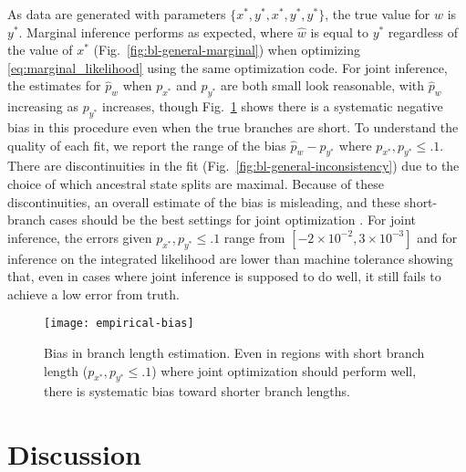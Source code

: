 \documentclass[11pt]{article}
\begin{document}
As data are generated with parameters $\{x^*, y^*, x^*, y^*, y^*\}$, the true value for $w$ is $y^*$.
Marginal inference performs as expected, where $\hat{w}$ is equal to $y^*$ regardless of the value of $x^*$ (Fig.~\ref{fig:bl-general-marginal}) when optimizing \eqref{eq:marginal_likelihood} using the same optimization code.
For joint inference, the estimates for $\hat{p}_w$ when $p_{x^*}$ and $p_{y^*}$ are both small look reasonable, with $\hat{p}_w$ increasing as $p_{y^*}$ increases, though Fig.~\ref{fig:empirical-bias} shows there is a systematic negative bias in this procedure even when the true branches are short.
To understand the quality of each fit, we report the range of the bias $\hat{p}_w-p_{y^*}$ where $p_{x^*}, p_{y^*} \le .1$.
There are discontinuities in the fit (Fig.~\ref{fig:bl-general-inconsistency}) due to the choice of which ancestral state splits are maximal.
Because of these discontinuities, an overall estimate of the bias is misleading, and these short-branch cases should be the best settings for joint optimization \citep{Sagulenko2018-xl}.
For joint inference, the errors given $p_{x^*}, p_{y^*} \le .1$ range from $[-2\times 10^{-2}, 3\times 10^{-3}]$ and for inference on the integrated likelihood are lower than machine tolerance showing that, even in cases where joint inference is supposed to do well, it still fails to achieve a low error from truth.

\begin{figure}
\centering
\texttt{[image: empirical-bias]}
\caption{
Bias in branch length estimation.
Even in regions with short branch length ($p_{x^*}, p_{y^*} \le .1$) where joint optimization should perform well, there is systematic bias toward shorter branch lengths.
}
\label{fig:empirical-bias}
\end{figure}

\section*{Discussion}
\end{document}
